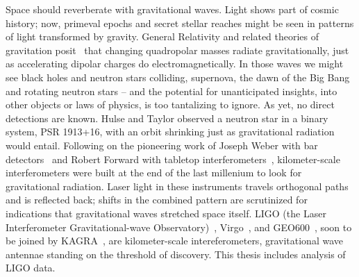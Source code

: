 



        Space should reverberate with gravitational waves. 
Light shows part of cosmic history; now, primeval epochs and secret stellar reaches might be seen in patterns of light transformed by gravity. 
General Relativity and related theories of gravitation posit~\cite{EinsteinRosen1937} that changing quadropolar masses radiate gravitationally, just as accelerating dipolar charges do electromagnetically. 
In those waves we might see black holes and neutron stars colliding, supernova, the dawn of the Big Bang and rotating neutron stars -- and the potential for unanticipated insights, into other objects or laws of physics, is too tantalizing to ignore. 
As yet, no direct detections are known. 
Hulse and Taylor \cite{HulseTaylor1975} observed a neutron star in a binary system, PSR 1913+16, with an orbit shrinking just as gravitational radiation would entail. 
Following on the pioneering work of Joseph Weber with bar detectors~\cite{Weber1960} and Robert Forward with tabletop interferometers~\cite{Forward1978}, kilometer-scale interferometers were built at the end of the last millenium to look for gravitational radiation. 
Laser light in these instruments travels orthogonal paths and is reflected back; shifts in the combined pattern are scrutinized for indications that gravitational waves stretched space itself. 
LIGO (the Laser Interferometer Gravitational-wave Observatory)~\cite{LIGOFirst2004,Fricke2009}, Virgo~\cite{Acernese2005}, and GEO600~\cite{Willke2002,Hild2009}, soon to be joined by KAGRA~\cite{Kuroda2010}, are kilometer-scale intereferometers, gravitational wave antennae standing on the threshold of discovery.
This thesis includes analysis of LIGO data.

